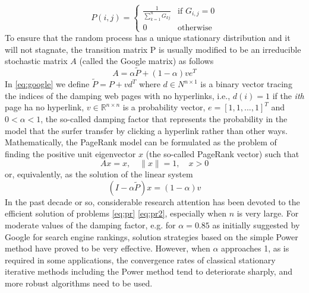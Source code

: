 \documentclass[12pt]{article}
\newcommand{\R}{\mathbb{R}}
\begin{document}
\begin{equation}\label{eq:transition}
    P(i,j) =
    \begin{cases}
        \displaystyle \frac{1}{\sum_{k=1}^n G_{kj}} & \text{if } G_{i,j} = 0 \\
        0 & \text{otherwise}
    \end{cases}
\end{equation}
To ensure that the random process has a unique stationary distribution and it will not stagnate, the transition matrix P is usually modified to be an irreducible stochastic matrix $A$ (called the Google matrix) as follows
\begin{equation}\label{eq:google}
    A = \alpha \tilde P + (1 - \alpha)v e^T
\end{equation}
In \ref{eq:google} we define $\tilde P = P + vd^T$ where $d \in N^{n \times 1}$ is a binary vector tracing the indices of the damping web pages with no hyperlinks, i.e., $d(i) = 1$ if the \emph{ith} page ha no hyperlink, $v \in \R^{n \times n}$ is a probability vector, $e = [1, 1, ... ,1]^T$ and $0<\alpha<1$, the so-called damping factor that represents the probability in the model that the surfer transfer by clicking a hyperlink rather than other ways. Mathematically, the PageRank model can be formulated as the problem of finding the positive unit eigenvector $x$ (the so-called PageRank vector) such that
\begin{equation}\label{eq:pr}
    Ax = x, \quad \lVert x \rVert = 1, \quad x > 0
\end{equation}
or, equivalently, as the solution of the linear system
\begin{equation}\label{eq:pr2}
    (I - \alpha \tilde P)x = (1 - \alpha)v
\end{equation}
In the past decade or so, considerable research attention has been devoted to the efficient solution of problems \ref{eq:pr} \ref{eq:pr2}, especially when $n$ is very large. For moderate values of the damping factor, e.g. for $\alpha = 0.85$ as initially suggested by Google for search engine rankings, solution strategies based on the simple Power method have proved to be very effective. However, when $\alpha$ approaches 1, as is required in some applications, the convergence rates of classical stationary iterative methods including the Power method tend to deteriorate sharply, and more robust algorithms need to be used. \\
\end{document}
